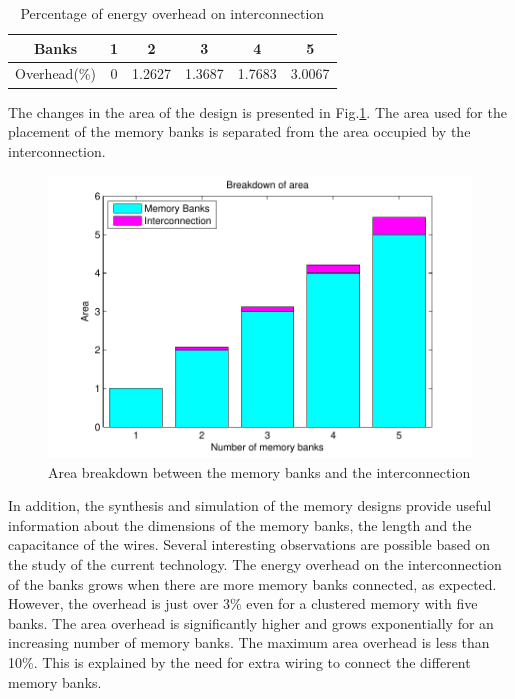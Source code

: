 \documentclass[12pt,a4paper]{article}
\begin{document}
\begin{table} 
\caption{Percentage of energy overhead on interconnection}
\label{tab:overhead}
\centering
\begin{tabular}{|c|c|c|c|c|c|}
\hline 
Banks & 1 & 2 & 3 & 4 & 5 \\
\hline 
Overhead(\%) & 0	&	1.2627 & 1.3687 & 1.7683 & 3.0067 \\ 
 \hline 
 \end{tabular} 
\end{table} 
 
The changes in the area of the design is presented in Fig.\ref{fig:areaE}.
The area used for the placement of the memory banks is separated from the area occupied by the interconnection.

\begin{figure}
 \centering
 \includegraphics[width = \textwidth]{area.pdf}
  \caption{Area breakdown between the memory banks and the interconnection}
 \label{fig:areaE}
 \end{figure}
  
In addition, the synthesis and simulation of the memory designs provide useful information about the dimensions of the memory banks, the length and the capacitance of the wires.
Several interesting observations are possible based on the study of the current technology.
The energy overhead on the interconnection of the banks grows when there are more memory banks connected, as expected.
However, the overhead is just over 3\% even for a clustered memory with five banks. 
The area overhead is significantly higher and grows exponentially for an increasing number of memory banks.  
The maximum area overhead is less than 10\%.
This is explained by the need for extra wiring to connect the different memory banks.
\end{document}
